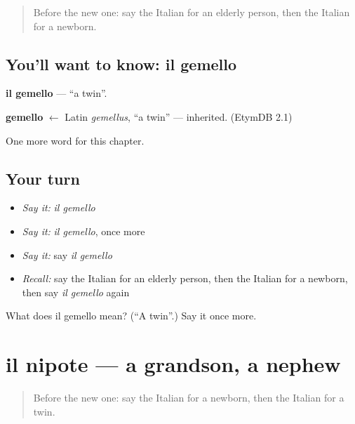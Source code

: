 \label{lesson:IT-C224-gemello}



\begin{quote}
Before the new one: say the Italian for an elderly person, then the Italian for a newborn.
\end{quote}

\subsection*{You'll want to know: il gemello}
\textbf{il gemello} — \textquotedblleft{}a twin\textquotedblright{}.

\begin{cousinweb}
\textbf{gemello} $\leftarrow$ Latin \emph{gemellus}, \textquotedblleft{}a twin\textquotedblright{} — inherited. (EtymDB 2.1)
\end{cousinweb}

\begin{grammarlens}[title={What you've built}]
One more word for this chapter.
\end{grammarlens}

\subsection*{Your turn}
\begin{itemize}
\raggedright
  \item \emph{Say it:} \emph{il gemello}
  \item \emph{Say it:} \emph{il gemello}, once more
  \item \emph{Say it:} say \emph{il gemello}
  \item \emph{Recall:} say the Italian for an elderly person, then the Italian for a newborn, then say \emph{il gemello} again
\end{itemize}

\begin{tcolorbox}[breakable,colback=teal!4,colframe=teal!35!black,title={Before you move on}]
What does il gemello mean? (\textquotedblleft{}A twin\textquotedblright{}.) Say it once more.
\end{tcolorbox}
\section[il nipote]{il nipote — a grandson, a nephew}

\label{lesson:IT-C224-nipote}



\begin{quote}
Before the new one: say the Italian for a newborn, then the Italian for a twin.
\end{quote}

